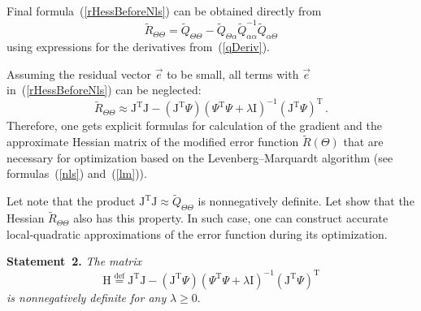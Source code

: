 \begin{multicols}{2}
Final formula~(\ref{rHessBeforeNls}) can be obtained directly from 
  $$
  \widetilde R_{\Theta\Theta} =  \widetilde Q_{\Theta\Theta} - 
  \widetilde Q_{\Theta\alpha} \widetilde Q_{\alpha \alpha}^{-1} 
  \widetilde Q_{\alpha \Theta}
  $$ 
  using expressions for the derivatives from~(\ref{qDeriv}).

\medskip

\noindent
Assuming the residual vector 
${\vec e}$ to be small,   all terms with ${\vec e}$ in~(\ref{rHessBeforeNls}) can be neglected:
\begin{equation}
  \label{HessianRfinal}
  \widetilde R_{\Theta\Theta} \approx \mathrm{J}^{\mathrm{T}}\mathrm{J}  - 
  \left(\mathrm{J}^{\mathrm{T}}  \Psi\right)
    \left( \Psi^{\mathrm{T}} \Psi + \lambda \mathrm{I}\right)^{-1} \left( \mathrm{J}^{\mathrm{T}} 
    \Psi\right)^{\mathrm{T}}\,.
\end{equation}
Therefore, one gets explicit formulas for calculation of the gradient and 
the approximate Hessian matrix of the modified error function $\widetilde R(\Theta)$ 
that are necessary for optimization based on the Levenberg--Marquardt algorithm 
(see formulas~(\ref{nls}) and~(\ref{lm})).

Let note that the product
$\mathrm{J}^{\mathrm{T}} \mathrm{J} \approx \widetilde Q_{\Theta\Theta}$ is 
nonnegatively definite.
Let show that the Hessian $\widetilde R_{\Theta\Theta}$ also has this property. 
In such case, one can construct accurate local-quadratic approximations of the error function during its optimization.

\medskip

\noindent
\textbf{Statement~2.} %
\textit{The matrix 
$$
\mathrm{H} \mathrel{\stackrel{\mathrm{def}}=} \mathrm{J}^{\mathrm{T}}
\mathrm{J}  - \left(\mathrm{J}^{\mathrm{T}}  \Psi\right)
    \left( \Psi^{\mathrm{T}} \Psi + \lambda \mathrm{I}\right)^{-1} 
    \left( \mathrm{J}^{\mathrm{T}} 
    \Psi\right)^{\mathrm{T}}$$ 
    is nonnegatively definite for any} $\lambda \ge 0$.

\medskip


\end{multicols}
